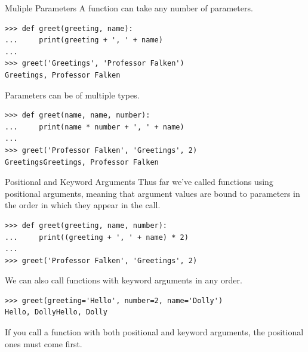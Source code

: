 \documentclass[smaller, aspectratio=1610]{beamer}
\begin{document}
\begin{frame}[label={sec:org4d91f47},fragile]{Muliple Parameters}
 A function can take any number of parameters.

\lstset{language=Python,label= ,caption= ,captionpos=b,numbers=none}
\begin{lstlisting}
>>> def greet(greeting, name):
...     print(greeting + ', ' + name)
...
>>> greet('Greetings', 'Professor Falken')
Greetings, Professor Falken
\end{lstlisting}

Parameters can be of multiple types.

\lstset{language=Python,label= ,caption= ,captionpos=b,numbers=none}
\begin{lstlisting}
>>> def greet(name, name, number):
...     print(name * number + ', ' + name)
...
>>> greet('Professor Falken', 'Greetings', 2)
GreetingsGreetings, Professor Falken
\end{lstlisting}
\end{frame}

\begin{frame}[label={sec:orgb7fe25c},fragile]{Positional and Keyword Arguments}
 Thus far we've called functions using positional arguments, meaning that argument values are bound to parameters in the order in which they appear in the call.

\lstset{language=Python,label= ,caption= ,captionpos=b,numbers=none}
\begin{lstlisting}
>>> def greet(greeting, name, number):
...     print((greeting + ', ' + name) * 2)
...
>>> greet('Professor Falken', 'Greetings', 2)
\end{lstlisting}

We can also call functions with keyword arguments in any order.

\lstset{language=Python,label= ,caption= ,captionpos=b,numbers=none}
\begin{lstlisting}
>>> greet(greeting='Hello', number=2, name='Dolly')
Hello, DollyHello, Dolly
\end{lstlisting}

If you call a function with both positional and keyword arguments, the positional ones must come first.
\end{frame}
\end{document}
